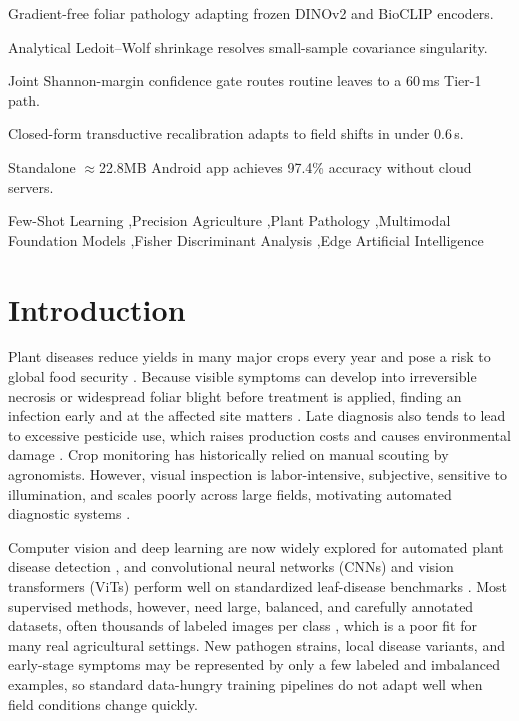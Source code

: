 \documentclass[preprint,12pt]{elsarticle}
\begin{document}
\begin{frontmatter}
\begin{highlights}
\item Gradient-free foliar pathology adapting frozen DINOv2 and BioCLIP encoders.
\item Analytical Ledoit--Wolf shrinkage resolves small-sample covariance singularity.
\item Joint Shannon-margin confidence gate routes routine leaves to a 60\,ms Tier-1 path.
\item Closed-form transductive recalibration adapts to field shifts in under 0.6\,s.
\item Standalone $\approx$22.8MB Android app achieves 97.4\% accuracy without cloud servers.
\end{highlights}

\begin{keyword}
Few-Shot Learning \sep Precision Agriculture \sep Plant Pathology \sep Multimodal Foundation Models \sep Fisher Discriminant Analysis \sep Edge Artificial Intelligence
\end{keyword}

\end{frontmatter}

\section{Introduction}
\label{sec:intro}
Plant diseases reduce yields in many major crops every year and pose a risk to global food security \cite{richard2022control}. Because visible symptoms can develop into irreversible necrosis or widespread foliar blight before treatment is applied, finding an infection early and at the affected site matters \cite{richard2022control}. Late diagnosis also tends to lead to excessive pesticide use, which raises production costs and causes environmental damage \cite{khakimov2022traditional}. Crop monitoring has historically relied on manual scouting by agronomists. However, visual inspection is labor-intensive, subjective, sensitive to illumination, and scales poorly across large fields, motivating automated diagnostic systems \cite{khakimov2022traditional}.

Computer vision and deep learning are now widely explored for automated plant disease detection \cite{shafik2023systematic}, and convolutional neural networks (CNNs) and vision transformers (ViTs) perform well on standardized leaf-disease benchmarks \cite{shoaib2023advanced}. Most supervised methods, however, need large, balanced, and carefully annotated datasets, often thousands of labeled images per class \cite{shoaib2023advanced}, which is a poor fit for many real agricultural settings. New pathogen strains, local disease variants, and early-stage symptoms may be represented by only a few labeled and imbalanced examples, so standard data-hungry training pipelines do not adapt well when field conditions change quickly.
\end{document}
